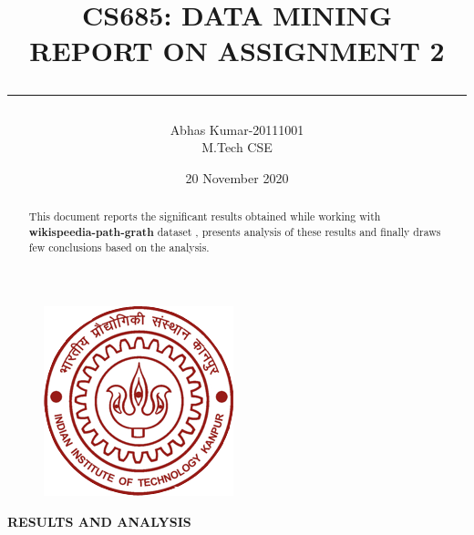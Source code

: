 \documentclass[12pt]{article}
\title{%
\textbf{CS685: DATA MINING\\
REPORT ON ASSIGNMENT 2\\}
\rule{\textwidth}{2pt}
}
\author{%
Abhas Kumar-20111001\\
M.Tech CSE\\
}
\date{20 November 2020}
\begin{document}
\begin{figure}[t]
\centering
\includegraphics[scale=0.4]{IITK.png}
\end{figure}

\maketitle
\begin{abstract}
\begin{center}
This document reports the significant results obtained while working with \textbf{wikispeedia-path-grath} dataset , presents analysis of these results and finally draws few conclusions based on the analysis.
\end{center} 
\end{abstract}
\textbf{RESULTS AND ANALYSIS}
\end{document}
